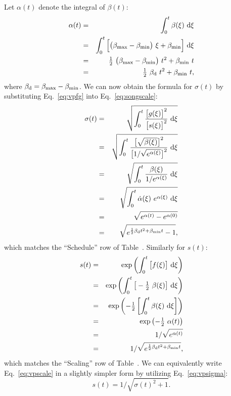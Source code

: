 Let $\alpha(t)$ denote the integral of $\beta(t)$:
\begin{eqnarray}
  \alpha(t) &=& \int_0^t \beta(\xi) ~\mathrm{d}\xi \\
  &=& \int_0^t \Big[ \big( \beta_\text{max} - \beta_\text{min} \big) ~\xi + \beta_\text{min} \Big] ~\mathrm{d}\xi \\
  &=& \tfrac{1}{2} ~\big( \beta_\text{max} - \beta_\text{min} \big) ~t^2 + \beta_\text{min} ~t \\
  &=& \tfrac{1}{2} ~\beta_\text{d} ~t^2 + \beta_\text{min} ~t
  \text{,}
\end{eqnarray}
where $\beta_\text{d} = \beta_\text{max} - \beta_\text{min}$.
We can now obtain the formula for $\sigma(t)$ by substituting Eq.~\ref{eq:vpfg} into Eq.~\ref{eq:songscale}:
\begin{eqnarray}
  \sigma(t) &=& \sqrt{\int_0^t \frac{\big[ g(\xi) \big]^2}{\big[ s(\xi) \big]^2} ~\mathrm{d}\xi} \\
  &=& \sqrt{\int_0^t \frac{\big[ \sqrt{\beta(\xi)} \big]^2}{\big[ 1 / \sqrt{e^{\alpha(\xi)}} \big]^2} ~\mathrm{d}\xi} \\
  &=& \sqrt{\int_0^t \frac{\beta(\xi)}{1 / e^{\alpha(\xi)}} ~\mathrm{d}\xi} \\
  &=& \sqrt{\int_0^t \dot\alpha(\xi) ~e^{\alpha(\xi)} ~\mathrm{d}\xi} \\
  &=& \sqrt{e^{\alpha(t)} - e^{\alpha(0)}} \\
  &=& \sqrt{e^{\frac{1}{2} \beta_\text{d} t^2 + \beta_\text{min} t} - 1}
  \label{eq:vpsigma}
  \text{,}
\end{eqnarray}
which matches the ``Schedule'' row of Table~.
Similarly for $s(t)$:
\begin{eqnarray}
  s(t) &=& \exp\left( \int_0^t \big[ f(\xi) \big] ~\mathrm{d}\xi \right) \\
  &=& \exp\left( \int_0^t \big[ -\tfrac{1}{2} ~\beta(\xi) \big] ~\mathrm{d}\xi \right) \\
  &=& \exp\left( -\tfrac{1}{2} \left[ \int_0^t \beta(\xi) ~\mathrm{d}\xi \right] \right) \\
  &=& \exp\left( -\tfrac{1}{2} ~\alpha(t) \right) \\
  &=& 1 / \sqrt{e^{\alpha(t)}} \\
  &=& 1 / \sqrt{e^{\frac{1}{2} \beta_\text{d} t^2 + \beta_\text{min} t}}
  \label{eq:vpscale}
  \text{,}
\end{eqnarray}
which matches the ``Scaling'' row of Table~.
We can equivalently write Eq.~\ref{eq:vpscale} in a slightly simpler form by utilizing Eq.~\ref{eq:vpsigma}:
\begin{equation}
  s(t) = 1 / \sqrt{\sigma(t)^2 + 1}
  \label{eq:vpscalesimple}
  \text{.}
\end{equation}

